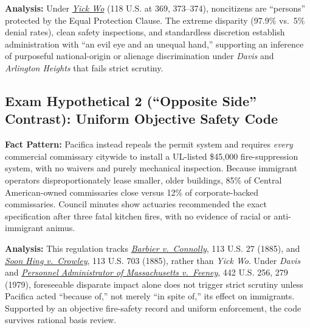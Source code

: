 \documentclass[12pt]{article}
\begin{document}
\textbf{Analysis:} Under \href{https://supreme.justia.com/cases/federal/us/118/356/}{\emph{Yick Wo}} (118 U.S. at 369, 373--374), noncitizens are ``persons'' protected by the Equal Protection Clause. The extreme disparity (97.9\% vs.\ 5\% denial rates), clean safety inspections, and standardless discretion establish administration with ``an evil eye and an unequal hand,'' supporting an inference of purposeful national-origin or alienage discrimination under \emph{Davis} and \emph{Arlington Heights} that fails strict scrutiny.

\subsection{Exam Hypothetical 2 (``Opposite Side'' Contrast): Uniform Objective Safety Code}
\textbf{Fact Pattern:} Pacifica instead repeals the permit system and requires \emph{every} commercial commissary citywide to install a UL-listed \$45,000 fire-suppression system, with no waivers and purely mechanical inspection. Because immigrant operators disproportionately lease smaller, older buildings, 85\% of Central American-owned commissaries close versus 12\% of corporate-backed commissaries. Council minutes show actuaries recommended the exact specification after three fatal kitchen fires, with no evidence of racial or anti-immigrant animus.

\textbf{Analysis:} This regulation tracks \href{https://supreme.justia.com/cases/federal/us/113/27/}{\emph{Barbier v.\ Connolly}}, 113 U.S. 27 (1885), and \href{https://supreme.justia.com/cases/federal/us/113/703/}{\emph{Soon Hing v.\ Crowley}}, 113 U.S. 703 (1885), rather than \emph{Yick Wo}. Under \emph{Davis} and \href{https://supreme.justia.com/cases/federal/us/442/256/}{\emph{Personnel Administrator of Massachusetts v.\ Feeney}}, 442 U.S. 256, 279 (1979), foreseeable disparate impact alone does not trigger strict scrutiny unless Pacifica acted ``because of,'' not merely ``in spite of,'' its effect on immigrants. Supported by an objective fire-safety record and uniform enforcement, the code survives rational basis review.
\end{document}
